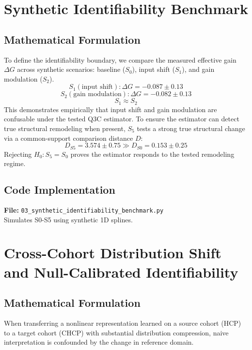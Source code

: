 \documentclass{article}
\begin{document}
\section{Synthetic Identifiability Benchmark}
\subsection{Mathematical Formulation}
To define the identifiability boundary, we compare the measured effective gain $\Delta G$ across synthetic scenarios: baseline ($S_0$), input shift ($S_1$), and gain modulation ($S_2$).
\begin{equation}
S_1 (\text{input shift}): \Delta G = -0.087 \pm 0.13
\end{equation}
\begin{equation}
S_2 (\text{gain modulation}): \Delta G = -0.082 \pm 0.13
\end{equation}
\begin{equation}
S_1 \approx S_2
\end{equation}
This demonstrates empirically that input shift and gain modulation are confusable under the tested Q3C estimator. To ensure the estimator can detect true structural remodeling when present, $S_5$ tests a strong true structural change via a common-support comparison distance $D$:
\begin{equation}
D_{S5} = 3.574 \pm 0.75 \gg D_{S0} = 0.153 \pm 0.25
\end{equation}
Rejecting $H_0: S_5 = S_0$ proves the estimator responds to the tested remodeling regime.

\subsection{Code Implementation}
\textbf{File:} \texttt{03\_synthetic\_identifiability\_benchmark.py} \\
Simulates S0-S5 using synthetic 1D splines.

\section{Cross-Cohort Distribution Shift and Null-Calibrated Identifiability}
\subsection{Mathematical Formulation}
When transferring a nonlinear representation learned on a source cohort (HCP) to a target cohort (CHCP) with substantial distribution compression, naive interpretation is confounded by the change in reference domain.
\end{document}
